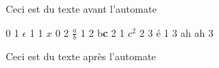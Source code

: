 \documentclass{article}
\begin{document}
Ceci est du texte avant l'automate

\begin{center}
\begin{fsm}
0 1 $\epsilon$
1 1 $x$
0 2 $\frac{a}{b}$
1 2 b{\bf c}
2 1 $c^2$
2 3 {\'e}
1 3 ah ah
3
\end{fsm}
\end{center}

Ceci est du texte après l'automate
\end{document}

